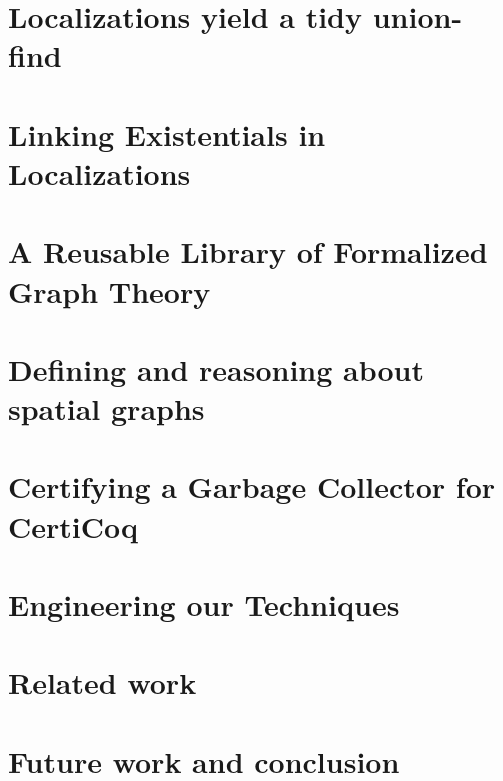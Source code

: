 \documentclass[acmsmall]{acmart}\settopmatter{}
\begin{document}
\section{Localizations yield a tidy union-find}
\label{sec:orientation}


\section{Linking Existentials in Localizations}
\label{sec:localizations}


\section{A Reusable Library of Formalized Graph Theory}
\label{sec:mathgraph}


\section{Defining and reasoning about spatial graphs}
\label{sec:spacegraph}


\section{Certifying a Garbage Collector for CertiCoq}
\label{sec:certigc}


\section{Engineering our Techniques}
\label{sec:development}


\section{Related work}
\label{sec:related}


\section{Future work and conclusion}
\label{sec:future}
\label{sec:conclusion}

\end{document}
